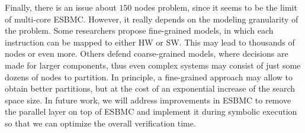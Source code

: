 \documentclass{doublecol-new}
\theoremstyle{TH}{
\newtheorem{lemma}{Lemma}
\newtheorem{theorem}[lemma]{Theorem}
\newtheorem{corrolary}[lemma]{Corrolary}
\newtheorem{conjecture}[lemma]{Conjecture}
\newtheorem{proposition}[lemma]{Proposition}
\newtheorem{claim}[lemma]{Claim}
\newtheorem{stheorem}[lemma]{Wrong Theorem}
\newtheorem{algorithm}{Algorithm}
}
\theoremstyle{THrm}{
\newtheorem{definition}{Definition}[section]
\newtheorem{question}{Question}[section]
\newtheorem{remark}{Remark}
\newtheorem{scheme}{Scheme}
}
\theoremstyle{THhit}{
\newtheorem{case}{Case}[section]
}
\begin{document}
Finally, there is an issue about $150$ nodes problem, since it seems to be the limit of multi-core ESBMC. However, it really depends on the modeling granularity of the problem. Some researchers propose fine-grained models, in which each instruction can be mapped to either HW or SW. This may lead to thousands of nodes or even more. Others defend coarse-grained models, where decisions are made for larger components, thus even complex systems may consist of just some dozens of nodes to partition. In principle, a fine-grained approach may allow to obtain better partitions, but at the cost of an exponential increase of the search space size. In future work, we will address improvements in ESBMC to remove the parallel layer on top of ESBMC and implement it during symbolic execution so that we can optimize the overall verification time.
\end{document}
